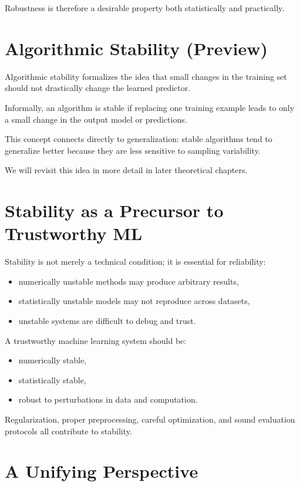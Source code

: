 Robustness is therefore a desirable property both statistically and practically.

\section{Algorithmic Stability (Preview)}

Algorithmic stability formalizes the idea that small changes in the training set should not drastically change the learned predictor.

Informally, an algorithm is stable if replacing one training example leads to only a small change in the output model or predictions.

This concept connects directly to generalization: stable algorithms tend to generalize better because they are less sensitive to sampling variability.

We will revisit this idea in more detail in later theoretical chapters.

\section{Stability as a Precursor to Trustworthy ML}

Stability is not merely a technical condition; it is essential for reliability:
\begin{itemize}
    \item numerically unstable methods may produce arbitrary results,
    \item statistically unstable models may not reproduce across datasets,
    \item unstable systems are difficult to debug and trust.
\end{itemize}

A trustworthy machine learning system should be:
\begin{itemize}
    \item numerically stable,
    \item statistically stable,
    \item robust to perturbations in data and computation.
\end{itemize}

Regularization, proper preprocessing, careful optimization, and sound evaluation protocols all contribute to stability.

\section{A Unifying Perspective}

